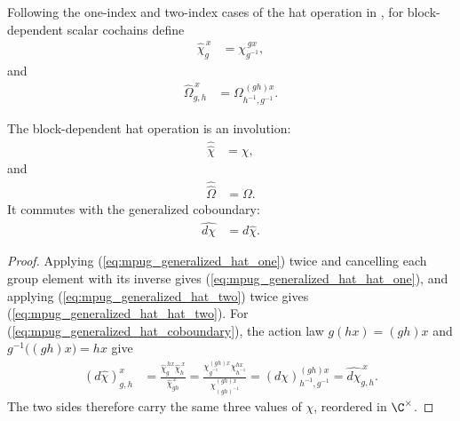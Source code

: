 \begin{definition}
    \label{def:mpug_generalized_hat}
    \leanok
    Following the one-index and two-index cases of the hat operation in
    \cite[line~5912]{FrancoRubio2025MPUGauging}, for block-dependent scalar
    cochains define
    \begin{align}
        \widehat\chi^{\,x}_g
         & =\chi^{\,g x}_{g^{-1}},
        \label{eq:mpug_generalized_hat_one}
    \end{align}
    and
    \begin{align}
        \widehat\Omega^{\,x}_{g,h}
         & =\Omega^{\,(gh)x}_{h^{-1},g^{-1}}.
        \label{eq:mpug_generalized_hat_two}
    \end{align}
\end{definition}

\begin{lemma}
    \label{thm:mpug_generalized_hat_coboundary}
    \leanok
    The block-dependent hat operation is an involution:
    \begin{align}
        \widehat{\widehat\chi} & =\chi,
        \label{eq:mpug_generalized_hat_hat_one}
    \end{align}
    and
    \begin{align}
        \widehat{\widehat\Omega} & =\Omega.
        \label{eq:mpug_generalized_hat_hat_two}
    \end{align}
    It commutes with the generalized coboundary:
    \begin{align}
        \widehat{d\chi} & =d\widehat\chi.
        \label{eq:mpug_generalized_hat_coboundary}
    \end{align}
\end{lemma}

\begin{proof}\leanok
    Applying (\ref{eq:mpug_generalized_hat_one}) twice and cancelling each
    group element with its inverse gives
    (\ref{eq:mpug_generalized_hat_hat_one}), and applying
    (\ref{eq:mpug_generalized_hat_two}) twice gives
    (\ref{eq:mpug_generalized_hat_hat_two}). For
    (\ref{eq:mpug_generalized_hat_coboundary}), the action law
    $g(h x)=(gh)x$ and $g^{-1}\bigl((gh)x\bigr)=h x$ give
    \begin{align}
        (d\widehat\chi)^x_{g,h}
         & =\frac{\widehat\chi^{\,h x}_g\widehat\chi^{\,x}_h}
        {\widehat\chi^{\,x}_{gh}}
        =\frac{\chi^{(gh)x}_{g^{-1}}\chi^{h x}_{h^{-1}}}
        {\chi^{(gh)x}_{(gh)^{-1}}}
        =(d\chi)^{(gh)x}_{h^{-1},g^{-1}}
        =\widehat{d\chi}^{\,x}_{g,h}.
    \end{align}
    The two sides therefore carry the same three values of $\chi$, reordered
    in $\C^\times$.
\end{proof}

